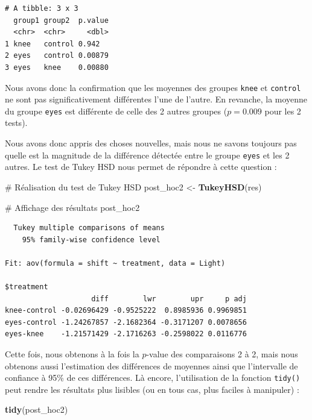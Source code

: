 \documentclass[a4paperpaper,]{article}
\newenvironment{Shaded}{\begin{snugshade}}{\end{snugshade}}
\newcommand{\CommentTok}[1]{\textcolor[rgb]{0.54,0.53,0.53}{#1}}
\newcommand{\KeywordTok}[1]{\textcolor[rgb]{0.12,0.11,0.11}{\textbf{#1}}}
\newcommand{\NormalTok}[1]{\textcolor[rgb]{0.12,0.11,0.11}{#1}}
\newcommand{\StringTok}[1]{\textcolor[rgb]{0.75,0.01,0.01}{#1}}
\begin{document}
\begin{verbatim}
# A tibble: 3 x 3
  group1 group2  p.value
  <chr>  <chr>     <dbl>
1 knee   control 0.942  
2 eyes   control 0.00879
3 eyes   knee    0.00880
\end{verbatim}

Nous avons donc la confirmation que les moyennes des groupes \texttt{knee} et \texttt{control} ne sont pas significativement différentes l'une de l'autre. En revanche, la moyenne du groupe \texttt{eyes} est différente de celle des 2 autres groupes (\(p = 0.009\) pour les 2 tests).

Nous avons donc appris des choses nouvelles, mais nous ne savons toujours pas quelle est la magnitude de la différence détectée entre le groupe \texttt{eyes} et les 2 autres. Le test de Tukey HSD nous permet de répondre à cette question :

\begin{Shaded}
\begin{Highlighting}[]
\CommentTok{# Réalisation du test de Tukey HSD}
\NormalTok{post_hoc2 <-}\StringTok{ }\KeywordTok{TukeyHSD}\NormalTok{(res)}

\CommentTok{# Affichage des résultats}
\NormalTok{post_hoc2}
\end{Highlighting}
\end{Shaded}

\begin{verbatim}
  Tukey multiple comparisons of means
    95% family-wise confidence level

Fit: aov(formula = shift ~ treatment, data = Light)

$treatment
                    diff        lwr        upr     p adj
knee-control -0.02696429 -0.9525222  0.8985936 0.9969851
eyes-control -1.24267857 -2.1682364 -0.3171207 0.0078656
eyes-knee    -1.21571429 -2.1716263 -0.2598022 0.0116776
\end{verbatim}

Cette fois, nous obtenons à la fois la \(p\)-value des comparaisons 2 à 2, mais nous obtenons aussi l'estimation des différences de moyennes ainsi que l'intervalle de confiance à 95\% de ces différences. Là encore, l'utilisation de la fonction \texttt{tidy()} peut rendre les résultats plus lisibles (ou en tous cas, plus faciles à manipuler) :

\begin{Shaded}
\begin{Highlighting}[]
\KeywordTok{tidy}\NormalTok{(post_hoc2)}
\end{Highlighting}
\end{Shaded}
\end{document}
